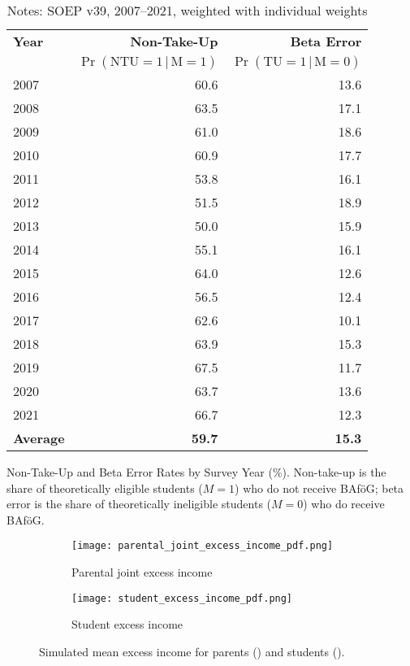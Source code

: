 \begin{table}[htbp]
\footnotesize
\centering
\begin{tabular}{l@{\hspace{2em}}r@{\hspace{2em}}r}
\toprule
\textbf{Year} & \textbf{Non-Take-Up}  &  \textbf{Beta Error}  \\
              & \(\Pr(\text{NTU} =1\,|\,\text{M} = 1)\) & \(\Pr(\text{TU} = 1\,|\,\text{M} = 0)\) \\
\midrule
2007 & 60.6 & 13.6 \\
2008 & 63.5 & 17.1 \\
2009 & 61.0 & 18.6 \\
2010 & 60.9 & 17.7 \\
2011 & 53.8 & 16.1 \\
2012 & 51.5 & 18.9 \\
2013 & 50.0 & 15.9 \\
2014 & 55.1 & 16.1 \\
2015 & 64.0 & 12.6 \\
2016 & 56.5 & 12.4 \\
2017 & 62.6 & 10.1 \\
2018 & 63.9 & 15.3 \\
2019 & 67.5 & 11.7 \\
2020 & 63.7 & 13.6 \\
2021 & 66.7 & 12.3 \\
\midrule
\textbf{Average} & \textbf{59.7} & \textbf{15.3} \\
\bottomrule
\end{tabular}
\caption{Non-Take-Up and Beta Error Rates by Survey Year (\%). Non-take-up is the share of theoretically eligible students (\(M=1\)) who do not receive BAföG; beta error is the share of theoretically ineligible students (\(M=0\)) who do receive BAföG.}
\caption*{\small{Notes: SOEP v39, 2007--2021, weighted with individual weights}}
\label{table:microsimulation-ntu}
\end{table}


\begin{figure}[htbp]
  \centering
  \begin{subfigure}[t]{0.48\linewidth}
    \texttt{[image: parental\_joint\_excess\_income\_pdf.png]}
    \caption{Parental joint excess income}
    \label{fig:parental-excess}
  \end{subfigure}
  \hfill
  \begin{subfigure}[t]{0.48\linewidth}
    \texttt{[image: student\_excess\_income\_pdf.png]}
    \caption{Student excess income}
    \label{fig:student-excess}
  \end{subfigure}
  \caption{Simulated mean excess income for parents () and students ().}
  \label{fig:excess-income}
\end{figure}

